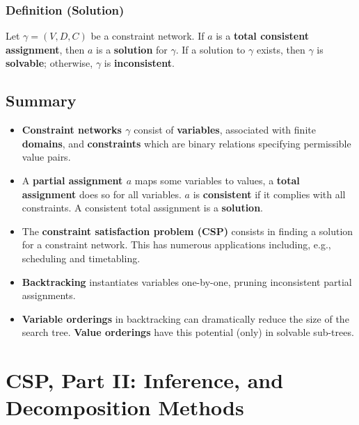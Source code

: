 \documentclass[conference]{styles/acmsiggraph}
\begin{document}
        \subsubsection{Definition (Solution)}
            Let $\gamma = (V,D,C)$ be a constraint network. 
            If $a$ is a \textbf{total consistent assignment}, then $a$ is a \textbf{solution} for $\gamma$.
            If a solution to $\gamma$ exists, then $\gamma$ is \textbf{solvable}; otherwise, $\gamma$ is \textbf{inconsistent}.
        
    \subsection{Summary}
        \begin{itemize}
            \item \textbf{Constraint networks $\gamma$} consist of \textbf{variables}, associated with finite \textbf{domains}, and \textbf{constraints} which are binary relations specifying permissible value pairs.
            \item A \textbf{partial assignment $a$} maps some variables to values, a \textbf{total assignment} does so for all variables. 
            $a$ is \textbf{consistent} if it complies with all constraints.
            A consistent total assignment is a \textbf{solution}.
            \item The \textbf{constraint satisfaction problem (CSP)} consists in finding a solution for a constraint network.
            This has numerous applications including, e.g., scheduling and timetabling.
            \item \textbf{Backtracking} instantiates variables one-by-one, pruning inconsistent partial assignments.
            \item \textbf{Variable orderings} in backtracking can dramatically reduce the size of the search tree. 
            \textbf{Value orderings} have this potential (only) in solvable sub-trees.
        \end{itemize}
    
    
    
    
    
    
    
    
    
    
\section{CSP, Part II: Inference, and Decomposition Methods}
    
\end{document}
